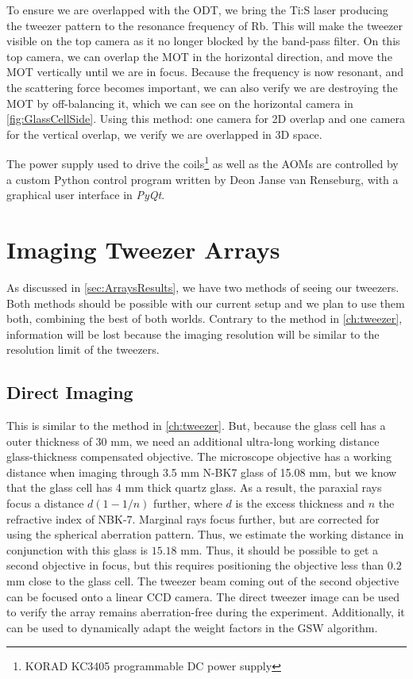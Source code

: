 To ensure we are overlapped with the ODT, we bring the \ac{Ti:S} laser producing the tweezer pattern to the resonance frequency of \ac{Rb}.
This will make the tweezer visible on the top camera as it no longer blocked by the band-pass filter.
On this top camera, we can overlap the \ac{MOT} in the horizontal direction, and move the MOT vertically until we are in focus. 
Because the frequency is now resonant, and the scattering force becomes important, we can also verify we are destroying the MOT by off-balancing it, which we can see on the horizontal camera in \cref{fig:GlassCellSide}.
Using this method: one camera for 2D overlap and one camera for the vertical overlap, we verify we are overlapped in 3D space. 

The power supply used to drive the coils\footnote{KORAD KC3405 programmable DC power supply} as well as the \ac{AOM}s are controlled by a custom Python control program written by Deon Janse van Renseburg, with a graphical user interface in \textit{PyQt}.


\section{Imaging Tweezer Arrays}\label{sec:TweezerImaging}

As discussed in \cref{sec:ArraysResults}, we have two methods of seeing our tweezers.
Both methods should be possible with our current setup and we plan to use them both, combining the best of both worlds.
Contrary to the method in \cref{ch:tweezer}, information will be lost because the imaging resolution will be similar to the resolution limit of the tweezers. 

\subsection{Direct Imaging}

This is similar to the method in \cref{ch:tweezer}. 
But, because the glass cell has a outer thickness of 30 mm, we need an additional ultra-long working distance glass-thickness compensated objective.
The microscope objective has a working distance when imaging through 3.5 mm N-BK7 glass of 15.08 mm, but we know that the glass cell has 4 mm thick quartz glass.
As a result, the paraxial rays focus a distance $d(1-1/n)$ further, where $d$ is the excess thickness and $n$ the refractive index of NBK-7.
Marginal rays focus further, but are corrected for using the spherical aberration pattern. 
Thus, we estimate the working distance in conjunction with this glass is $15.18$ mm. 
Thus, it should be possible to get a second objective in focus, but this requires positioning the objective less than $0.2$ mm close to the glass cell.
The tweezer beam coming out of the second objective can be focused onto a linear CCD camera. 
The direct tweezer image can be used to verify the array remains aberration-free during the experiment. 
Additionally, it can be used to dynamically adapt the weight factors in the \ac{GSW} algorithm. 

